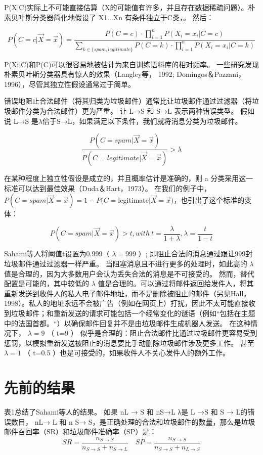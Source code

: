 \documentclass[UTF8]{ctexart}
\begin{document}
P(X|C)实际上不可能直接估算（X的可能值有许多，并且存在数据稀疏问题）。朴素贝叶斯分类器简化地假设了 X1...Xn  有条件独立于C类，。 然后：

$$P(C=c | \vec{X}=\vec{x})=\frac{P(C=c) \cdot \prod_{i=1}^{n} P\left(X_{i}=x_{i} | C=c\right)}{\sum_{k \in \{s p a m , l e g i t i m a t e \}} P(C=k) \cdot \prod_{i=1}^{n} P\left(X_{i}=x_{i} | C=k\right)}$$ 

P(Xi|C)和P(C)可以很容易地被估计为来自训练语料库的相对频率。 一些研究发现朴素贝叶斯分类器具有惊人的效果（Langley等， 1992; Domingos＆Pazzani，1996），尽管其独立性假设通常过于简单。 

错误地阻止合法邮件（将​​其归类为垃圾邮件）通常比让垃圾邮件通过过滤器（将垃圾邮件分类为合法邮件）更为严重。 让 L→S 和 S→L 表示两种错误类型。 假如说 L→S 是$\lambda$倍于S→L，如果满足以下条件，我们就将消息分类为垃圾邮件。

$$\frac{P(C=spam | \vec{X}=\vec{x})}{P(C= legitimate | \vec{X}=\vec{x})}>\lambda$$

在某种程度上独立性假设是成立的，并且概率估计是准确的，则 a 分类采用这一标准可以达到最佳效果（Duda＆Hart，1973）。 在我们的例子中，$P(C=spam | \vec{X}=\vec{x})=1-P(C=$legitimate$| \vec{X}=\vec{x})$，也引出了这个标准的变体：

$$P(C=spam | \vec{X}=\vec{x})>t, with\ t=\frac{\lambda}{1+\lambda}, \lambda=\frac{t}{1-t}$$

Sahami等人将阈值t设置为0.999（ $\lambda=999$ ）; 即阻止合法的消息通过跟让999封垃圾邮件通过过滤器一样严重。 当阻塞消息且不进行更多的处理时，如此高的 $\lambda$ 值是合理的，因为大多数用户会认为丢失合法的消息是不可接受的。 然而，替代配置是可能的，其中较低的 $\lambda$ 值是合理的。可以通过将邮件返回给发件人，将其重新发送到收件人的私人电子邮件地址，而不是删除被阻止的邮件（另见Hall，1998）。私人的地址永远不会被广告（例如在网页上）打扰，因此不太可能直接收到垃圾邮件；和重新发送的请求可能包括一个经常变化的谜语（例如“包括在主题中的法国首都。“）以确保邮件回复并不是由垃圾邮件生成机器人发送。 在这种情况下，  $\lambda=9$ （ t=9 ） 似乎是合理的：阻止合法邮件比通过垃圾邮件更容易受到惩罚，以模拟重新发送被阻止的消息要比手动删除垃圾邮件涉及更多工作。 甚至 $ \lambda=1$ （ t=0.5 ）也是可接受的，如果收件人不关心发件人的额外工作。

\section{先前的结果}
表1总结了Sahami等人的结果。 如果 nL → S 和  nS→L λ是 L →S 和 S → L的错误数目， nL→ L 和 n S→ S，是正确处理的合法和垃圾邮件的数量，那么是垃圾邮件召回率（SR）和垃圾邮件准确率（SP）是：$$S R=\frac{n_{S \rightarrow S}}{n_{S \rightarrow S}+n_{S \rightarrow L}} \quad S P=\frac{n_{S \rightarrow S}}{n_{S \rightarrow S}+n_{L \rightarrow S}}$$
\end{document}
